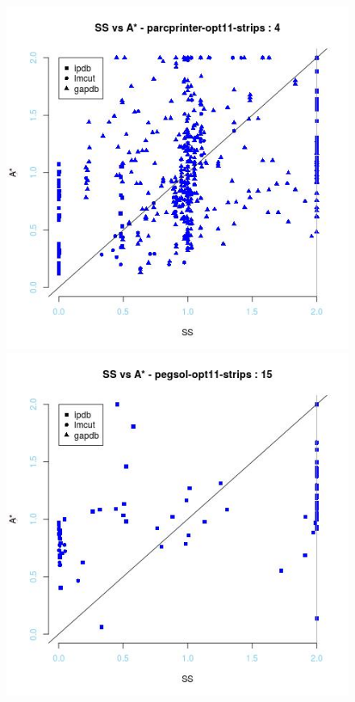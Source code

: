 \begin{figure}[!htb]
  \includegraphics[width=\linewidth]{images/parcprinter-opt11-strips}
\endminipage\hfill
{}
  \includegraphics[width=\linewidth]{images/pegsol-opt11-strips}

\end{figure}
